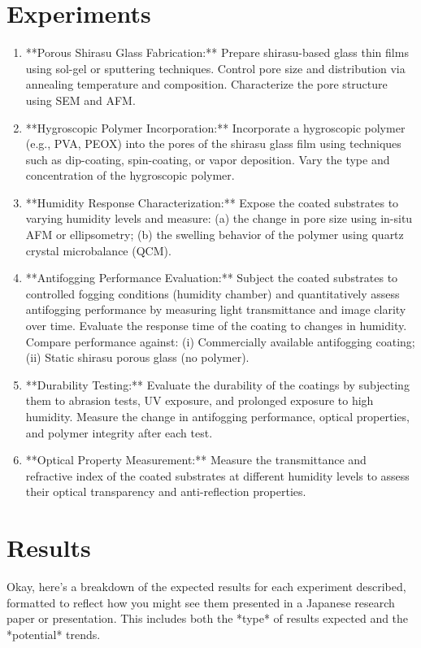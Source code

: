 \documentclass{article}
\begin{document}
\section{Experiments}
\begin{enumerate}
\item **Porous Shirasu Glass Fabrication:** Prepare shirasu-based glass thin films using sol-gel or sputtering techniques. Control pore size and distribution via annealing temperature and composition. Characterize the pore structure using SEM and AFM.
\item **Hygroscopic Polymer Incorporation:** Incorporate a hygroscopic polymer (e.g., PVA, PEOX) into the pores of the shirasu glass film using techniques such as dip-coating, spin-coating, or vapor deposition. Vary the type and concentration of the hygroscopic polymer.
\item **Humidity Response Characterization:** Expose the coated substrates to varying humidity levels and measure: (a) the change in pore size using in-situ AFM or ellipsometry; (b) the swelling behavior of the polymer using quartz crystal microbalance (QCM).
\item **Antifogging Performance Evaluation:** Subject the coated substrates to controlled fogging conditions (humidity chamber) and quantitatively assess antifogging performance by measuring light transmittance and image clarity over time. Evaluate the response time of the coating to changes in humidity. Compare performance against: (i) Commercially available antifogging coating; (ii) Static shirasu porous glass (no polymer).
\item **Durability Testing:** Evaluate the durability of the coatings by subjecting them to abrasion tests, UV exposure, and prolonged exposure to high humidity. Measure the change in antifogging performance, optical properties, and polymer integrity after each test.
\item **Optical Property Measurement:** Measure the transmittance and refractive index of the coated substrates at different humidity levels to assess their optical transparency and anti-reflection properties.
\end{enumerate}
\section{Results}
Okay, here's a breakdown of the expected results for each experiment described, formatted to reflect how you might see them presented in a Japanese research paper or presentation.  This includes both the *type* of results expected and the *potential* trends.
\end{document}
